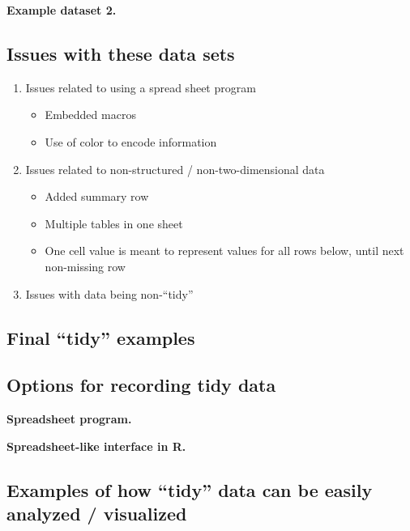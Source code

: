 \documentclass[]{tufte-book}
\providecommand{\tightlist}{%
  \setlength{\itemsep}{0pt}\setlength{\parskip}{0pt}}
\begin{document}
\textbf{Example dataset 2.}

\hypertarget{issues-with-these-data-sets}{%
\subsection{Issues with these data sets}\label{issues-with-these-data-sets}}

\begin{enumerate}
\def\labelenumi{\arabic{enumi}.}
\tightlist
\item
  Issues related to using a spread sheet program

  \begin{itemize}
  \tightlist
  \item
    Embedded macros
  \item
    Use of color to encode information
  \end{itemize}
\item
  Issues related to non-structured / non-two-dimensional data

  \begin{itemize}
  \tightlist
  \item
    Added summary row
  \item
    Multiple tables in one sheet
  \item
    One cell value is meant to represent values for all rows below, until next
    non-missing row
  \end{itemize}
\item
  Issues with data being non-``tidy''
\end{enumerate}

\hypertarget{final-tidy-examples}{%
\subsection{Final ``tidy'' examples}\label{final-tidy-examples}}

\hypertarget{options-for-recording-tidy-data}{%
\subsection{Options for recording tidy data}\label{options-for-recording-tidy-data}}

\textbf{Spreadsheet program.}

\textbf{Spreadsheet-like interface in R.}

\hypertarget{examples-of-how-tidy-data-can-be-easily-analyzed-visualized}{%
\subsection{Examples of how ``tidy'' data can be easily analyzed / visualized}\label{examples-of-how-tidy-data-can-be-easily-analyzed-visualized}}
\end{document}
